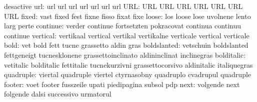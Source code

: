                            desactive
                      url: url                       url
                           url                       url
                           url                       url
                           url
                      URL: URL                       URL
                           URL                       URL
                           URL                       URL
                           URL
                    fixed: vast                      fixed
                           fest                      fixne
                           fisso                     fixat
                           fixe
                    loose: los                       loose
                           lose                      uvolnene
                           lento                     larg
                           perte
                 continue: verder                    continue
                           fortsetzten               pokracovat
                           continua                  continuu
                           continue
                 vertical: vertikaal                 vertical
                           vertikal                  vertikalne
                           verticale                 vertical
                           verticale
                     bold: vet                       bold
                           fett                      tucne
                           grassetto                 aldin
                           gras
              boldslanted: vetschuin                 boldslanted
                           fettgeneigt               tucnesklonene
                           grassettoinclinato        aldininclinat
                           inclinegras
               bolditalic: vetitalic                 bolditalic
                           fettitalic                tucnekurzivni
                           grassettocorsivo          aldinitalic
                           italiquegras
                quadruple: viertal                   quadruple
                           viertel                   ctyrnasobny
                           quadruplo                 cvadrupul
                           quadruple
                   footer: voet                      footer
                           fusszeile                 upati
                           piedipagina               subsol
                           pdp
                     next: volgende                  next
                           folgende                  dalsi
                           successivo                urmatorul

